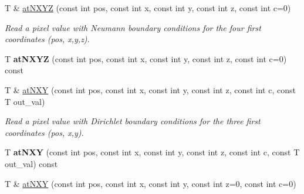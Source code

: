 \begin{DoxyCompactItemize}
\item 
\hypertarget{structcimg__library_1_1CImgList_a90b58c00eec5108c8278946b473e91ea}{
T \& \hyperlink{structcimg__library_1_1CImgList_a90b58c00eec5108c8278946b473e91ea}{atNXYZ} (const int pos, const int x, const int y, const int z, const int c=0)}
\label{structcimg__library_1_1CImgList_a90b58c00eec5108c8278946b473e91ea}

\begin{DoxyCompactList}\small\item\em Read a pixel value with Neumann boundary conditions for the four first coordinates ({\ttfamily pos}, {\ttfamily x},{\ttfamily y},{\ttfamily z}). \item\end{DoxyCompactList}\item 
\hypertarget{structcimg__library_1_1CImgList_abc90c020d54fbc3e435d7ef061bcd2b7}{
T {\bfseries atNXYZ} (const int pos, const int x, const int y, const int z, const int c=0) const }
\label{structcimg__library_1_1CImgList_abc90c020d54fbc3e435d7ef061bcd2b7}

\item 
\hypertarget{structcimg__library_1_1CImgList_a58b8e4d5309ba350ec0aded9895debc4}{
T \& \hyperlink{structcimg__library_1_1CImgList_a58b8e4d5309ba350ec0aded9895debc4}{atNXY} (const int pos, const int x, const int y, const int z, const int c, const T out\_\-val)}
\label{structcimg__library_1_1CImgList_a58b8e4d5309ba350ec0aded9895debc4}

\begin{DoxyCompactList}\small\item\em Read a pixel value with Dirichlet boundary conditions for the three first coordinates ({\ttfamily pos}, {\ttfamily x},{\ttfamily y}). \item\end{DoxyCompactList}\item 
\hypertarget{structcimg__library_1_1CImgList_a8b6bf5ee9e485be0161b6a38dc3ebc7d}{
T {\bfseries atNXY} (const int pos, const int x, const int y, const int z, const int c, const T out\_\-val) const }
\label{structcimg__library_1_1CImgList_a8b6bf5ee9e485be0161b6a38dc3ebc7d}

\item 
\hypertarget{structcimg__library_1_1CImgList_a1bf5a6f22d96117a961d888bfeaed2f2}{
T \& \hyperlink{structcimg__library_1_1CImgList_a1bf5a6f22d96117a961d888bfeaed2f2}{atNXY} (const int pos, const int x, const int y, const int z=0, const int c=0)}
\label{structcimg__library_1_1CImgList_a1bf5a6f22d96117a961d888bfeaed2f2}


\end{DoxyCompactItemize}
